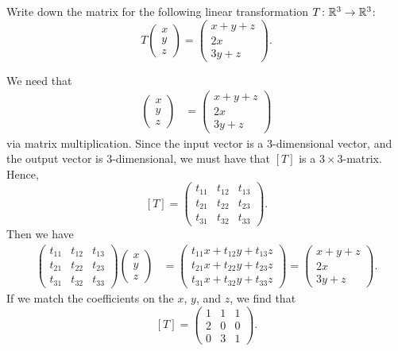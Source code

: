 \documentclass[12pt]{article} %
\begin{document}
\newpage
\begin{problem}
Write down the matrix for the following linear transformation $T\colon \mathbb{R}^3 \to \mathbb{R}^3$:
\[
T\begin{pmatrix} x\\ y\\ z \end{pmatrix}
= \begin{pmatrix} x+y+z\\ 2x\\ 3y + z \end{pmatrix}.
\]
\end{problem}
\begin{solution}
We need that
\begin{align*}
[T] \begin{pmatrix} x \\ y \\ z \end{pmatrix} &= \begin{pmatrix} x+y+z\\ 2x\\ 3y + z \end{pmatrix}
\end{align*}
via matrix multiplication. Since the input vector is a 3-dimensional vector, and the output vector is $3$-dimensional, we must have that $[T]$ is a $3\times 3$-matrix. Hence,
\[
[T] = \begin{pmatrix} t_{11} & t_{12} & t_{13} \\ t_{21} & t_{22} & t_{23} \\ t_{31} & t_{32} & t_{33} \end{pmatrix}.
\]
Then we have
\begin{align*}
\begin{pmatrix} t_{11} & t_{12} & t_{13} \\ t_{21} & t_{22} & t_{23} \\ t_{31} & t_{32} & t_{33} \end{pmatrix} \begin{pmatrix} x \\ y \\ z \end{pmatrix} &=  \begin{pmatrix} t_{11}x + t_{12}y + t_{13}z \\ t_{21}x +  t_{22}y + t_{23}z \\ t_{31}x + t_{32}y + t_{33}z \end{pmatrix} = \begin{pmatrix} x + y + z \\ 2x \\ 3y+z \end{pmatrix}.
\end{align*}
If we match the coefficients on the $x$, $y$, and $z$, we find that
\[
[T] = \begin{pmatrix} 1 & 1 & 1 \\ 2 & 0 & 0 \\ 0 & 3 & 1 \end{pmatrix}.
\]
\end{solution}
\end{document}
